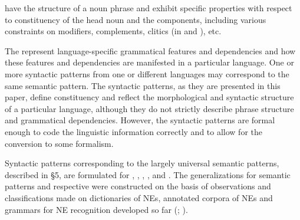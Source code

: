 \documentclass[output=paper]{langsci/langscibook}
\begin{document}
 have the structure of a noun phrase and exhibit specific
properties with respect to constituency of the head noun and the
components, including various constraints on modifiers, complements,
clitics (in  and ), etc.



The  represent language-specific grammatical features
and dependencies and how these features and dependencies are manifested
in a particular language. One or more syntactic patterns from one or
different languages may correspond to the same semantic pattern. The
syntactic patterns, as they are presented in this paper, define
constituency and reflect the morphological and syntactic structure of a
particular language, although they do not strictly describe phrase
structure and grammatical dependencies. However, the syntactic patterns
are formal enough to code the linguistic information correctly and to
allow for the conversion to some formalism.



Syntactic patterns corresponding to the largely universal semantic
patterns, described in §5, are formulated for ,
, , , and .
The generalizations for semantic
patterns and respective  were constructed on the
basis of observations and classifications made on dictionaries of NEs,
annotated corpora of NEs and grammars for NE recognition developed so
far (\citealt{krstev2013}; \citealt{koeva2015}).
\end{document}
